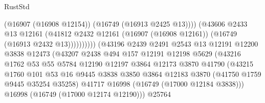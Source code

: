 \begin{lexlean}{RustStd}
\begin{coremodule}
                                              (@16907 (@16908 @12154))
                                              (@16749 (@16913 @2425 @13))))
                                          (@43606
                                            @2433
                                            @13
                                            @12161
                                            (@41812
                                              @2432
                                              @12161
                                              (@16907 (@16908 @12161))
                                              (@16749 (@16913 @2432 @13))))))))))
                              (@43196
                                @2439
                                @2491
                                @2543
                                @13
                                @12191
                                @12200
                                @3838
                                @12473
                                (@43207
                                  @2438
                                  @494
                                  @157
                                  @12191
                                  @12198
                                  @5629
                                  (@43216
                                    @1762
                                    @53
                                    @55
                                    @5784
                                    @12190
                                    @12197
                                    @3864
                                    @12173
                                    @3870
                                    @41790
                                    (@43215
                                      @1760
                                      @101
                                      @53
                                      @16
                                      @9445
                                      @3838
                                      @3850
                                      @3864
                                      @12183
                                      @3870
                                      (@41750 @1759 @9445 @35254 @35258)
                                      @41717
                                      @16998
                                      (@16749 (@17000 @12184 @3838)))
                                    @16998
                                    (@16749 (@17000 @12174 @12190)))
                                  @25764

\end{coremodule}
\end{lexlean}
